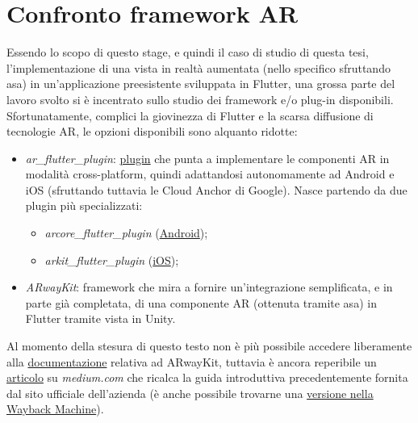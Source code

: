 \section{Confronto framework AR}
\label{sec:confronto-framework}
Essendo lo scopo di questo stage, e quindi il caso di studio di questa tesi, l'implementazione di una vista in realtà aumentata (nello specifico sfruttando asa) in un'applicazione preesistente sviluppata in Flutter, una grossa parte del lavoro svolto si è incentrato sullo studio dei framework e/o plug-in disponibili.\\
Sfortunatamente, complici la giovinezza di Flutter e la scarsa diffusione di tecnologie AR, le opzioni disponibili sono alquanto ridotte:
\begin{itemize}
    \item \textit{ar\_flutter\_plugin}: \href{https://pub.dev/packages/ar_flutter_plugin}{plugin} che punta a implementare le componenti AR in modalità cross-platform, quindi adattandosi autonomamente ad Android e iOS (sfruttando tuttavia le Cloud Anchor di Google). Nasce partendo da due plugin più specializzati: 
    \begin{itemize}
        \item \textit{arcore\_flutter\_plugin} (\href{https://github.com/giandifra/arcore_flutter_plugin}{Android});
        \item \textit{arkit\_flutter\_plugin} (\href{https://github.com/olexale/arkit_flutter_plugin}{iOS});
    \end{itemize}
    \item \textit{ARwayKit}: framework che mira a fornire un'integrazione semplificata, e in parte già completata, di una componente AR (ottenuta tramite asa) in Flutter tramite vista in Unity.
\end{itemize}
{\footnotesize Al momento della stesura di questo testo non è più possibile accedere liberamente alla \href{https://app.gitbook.com/s/-MCtct_TY9f3e8PrcV9T/arwaykit-with-flutter/quickstart-in-flutter}{documentazione} relativa ad ARwayKit, tuttavia è ancora reperibile un \href{https://medium.com/arway/building-ar-navigation-apps-with-flutter-and-arwaykit-280b69401cd9}{articolo} su \textit{medium.com} che ricalca la guida introduttiva precedentemente fornita dal sito ufficiale dell'azienda (è anche possibile trovarne una \href{https://web.archive.org/web/20220525060655/https://docs.arway.app/arwaykit-with-flutter/quickstart-in-flutter}{versione nella Wayback Machine}).}

